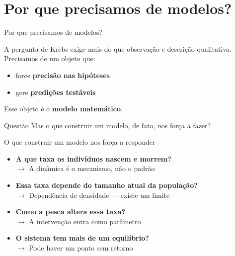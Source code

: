 \documentclass[12pt]{beamer}
\begin{document}
\section{Por que precisamos de modelos?}

\begin{frame}{Por que precisamos de modelos?}

  A pergunta de Krebs exige mais do que observação e descrição qualitativa.
  Precisamos de um objeto que:

  \bigskip
  \begin{itemize}
    \item force \textbf{precisão nas hipóteses}
    \item gere \textbf{predições testáveis}
  \end{itemize}

  \bigskip
  Esse objeto é o \textbf{modelo matemático}.

  \bigskip
  \begin{alertblock}{Questão}
    Mas o que construir um modelo, de fato, nos força a fazer?
  \end{alertblock}

\end{frame}

\begin{frame}{O que construir um modelo nos força a responder}

  \begin{itemize}
    \item \textbf{A que taxa os indivíduos nascem e morrem?}\\
      {\small $\rightarrow$ A dinâmica é o mecanismo, não o padrão}
    \bigskip
    \item \textbf{Essa taxa depende do tamanho atual da população?}\\
      {\small $\rightarrow$ Dependência de densidade --- existe um limite}
    \bigskip
    \item \textbf{Como a pesca altera essa taxa?}\\
      {\small $\rightarrow$ A intervenção entra como parâmetro}
    \bigskip
    \item \textbf{O sistema tem mais de um equilíbrio?}\\
      {\small $\rightarrow$ Pode haver um ponto sem retorno}
  \end{itemize}

\end{frame}
\end{document}
